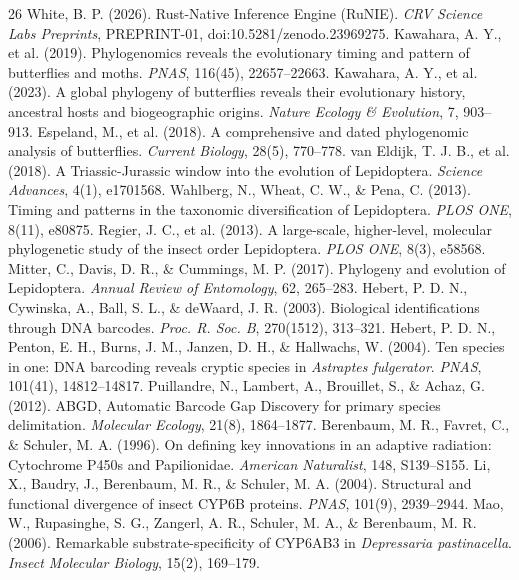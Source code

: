 \documentclass[10pt,letterpaper]{article}
\begin{document}
\begin{thebibliography}{26}
 White, B. P. (2026). Rust-Native Inference Engine (RuNIE). \textit{CRV Science Labs Preprints}, PREPRINT-01, doi:10.5281/zenodo.23969275.
 Kawahara, A. Y., et al. (2019). Phylogenomics reveals the evolutionary timing and pattern of butterflies and moths. \textit{PNAS}, 116(45), 22657--22663.
 Kawahara, A. Y., et al. (2023). A global phylogeny of butterflies reveals their evolutionary history, ancestral hosts and biogeographic origins. \textit{Nature Ecology \& Evolution}, 7, 903--913.
 Espeland, M., et al. (2018). A comprehensive and dated phylogenomic analysis of butterflies. \textit{Current Biology}, 28(5), 770--778.
 van Eldijk, T. J. B., et al. (2018). A Triassic-Jurassic window into the evolution of Lepidoptera. \textit{Science Advances}, 4(1), e1701568.
 Wahlberg, N., Wheat, C. W., \& Pena, C. (2013). Timing and patterns in the taxonomic diversification of Lepidoptera. \textit{PLOS ONE}, 8(11), e80875.
 Regier, J. C., et al. (2013). A large-scale, higher-level, molecular phylogenetic study of the insect order Lepidoptera. \textit{PLOS ONE}, 8(3), e58568.
 Mitter, C., Davis, D. R., \& Cummings, M. P. (2017). Phylogeny and evolution of Lepidoptera. \textit{Annual Review of Entomology}, 62, 265--283.
 Hebert, P. D. N., Cywinska, A., Ball, S. L., \& deWaard, J. R. (2003). Biological identifications through DNA barcodes. \textit{Proc. R. Soc. B}, 270(1512), 313--321.
 Hebert, P. D. N., Penton, E. H., Burns, J. M., Janzen, D. H., \& Hallwachs, W. (2004). Ten species in one: DNA barcoding reveals cryptic species in \textit{Astraptes fulgerator}. \textit{PNAS}, 101(41), 14812--14817.
 Puillandre, N., Lambert, A., Brouillet, S., \& Achaz, G. (2012). ABGD, Automatic Barcode Gap Discovery for primary species delimitation. \textit{Molecular Ecology}, 21(8), 1864--1877.
 Berenbaum, M. R., Favret, C., \& Schuler, M. A. (1996). On defining key innovations in an adaptive radiation: Cytochrome P450s and Papilionidae. \textit{American Naturalist}, 148, S139--S155.
 Li, X., Baudry, J., Berenbaum, M. R., \& Schuler, M. A. (2004). Structural and functional divergence of insect CYP6B proteins. \textit{PNAS}, 101(9), 2939--2944.
 Mao, W., Rupasinghe, S. G., Zangerl, A. R., Schuler, M. A., \& Berenbaum, M. R. (2006). Remarkable substrate-specificity of CYP6AB3 in \textit{Depressaria pastinacella}. \textit{Insect Molecular Biology}, 15(2), 169--179.

\end{thebibliography}
\end{document}
